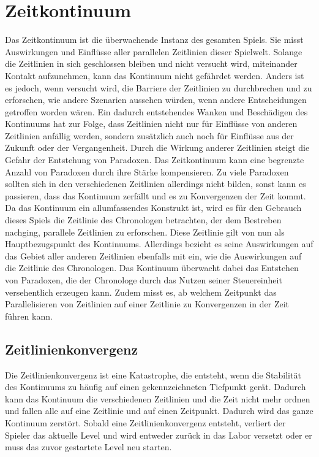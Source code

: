 \section{Zeitkontinuum}
Das Zeitkontinuum ist die überwachende Instanz des gesamten Spiels. Sie misst Auswirkungen und Einflüsse aller parallelen Zeitlinien dieser Spielwelt. Solange die Zeitlinien in sich geschlossen bleiben und nicht versucht wird, miteinander Kontakt aufzunehmen, kann das Kontinuum nicht gefährdet werden. Anders ist es jedoch, wenn versucht wird, die Barriere der Zeitlinien zu durchbrechen und zu erforschen, wie andere Szenarien aussehen würden, wenn andere Entscheidungen getroffen worden wären. Ein dadurch entstehendes Wanken und Beschädigen des Kontinuums hat zur Folge, dass Zeitlinien nicht nur für Einflüsse von anderen Zeitlinien anfällig werden, sondern zusätzlich auch noch für Einflüsse aus der Zukunft oder der Vergangenheit. Durch die Wirkung anderer Zeitlinien steigt die Gefahr der Entstehung von Paradoxen. Das Zeitkontinuum kann eine begrenzte Anzahl von Paradoxen durch ihre Stärke kompensieren. Zu viele Paradoxen sollten sich in den verschiedenen Zeitlinien allerdings nicht bilden, sonst kann es passieren, dass das Kontinuum zerfällt und es zu Konvergenzen der Zeit kommt. Da das Kontinuum ein allumfassendes Konstrukt ist, wird es für den Gebrauch dieses Spiels die Zeitlinie des Chronologen betrachten, der dem Bestreben nachging, parallele Zeitlinien zu erforschen. Diese Zeitlinie gilt von nun als Hauptbezugspunkt des Kontinuums. Allerdings bezieht es seine Auswirkungen auf das Gebiet aller anderen Zeitlinien ebenfalls mit ein, wie die Auswirkungen auf die Zeitlinie des Chronologen. Das Kontinuum überwacht dabei das Entstehen von Paradoxen, die der Chronologe durch das Nutzen seiner Steuereinheit versehentlich erzeugen kann. Zudem misst es, ab welchem Zeitpunkt das Parallelisieren von Zeitlinien auf einer Zeitlinie zu Konvergenzen in der Zeit führen kann.

\subsection{Zeitlinienkonvergenz}\label{sec:konvergenz}
Die Zeitlinienkonvergenz ist eine Katastrophe, die entsteht, wenn die Stabilität des Kontinuums zu häufig auf einen gekennzeichneten Tiefpunkt gerät. Dadurch kann das Kontinuum die verschiedenen Zeitlinien und die Zeit nicht mehr ordnen und fallen alle auf eine Zeitlinie und auf einen Zeitpunkt. Dadurch wird das ganze Kontinuum zerstört. Sobald eine Zeitlinienkonvergenz entsteht, verliert der Spieler das aktuelle Level und wird entweder zurück in das Labor versetzt oder er muss das zuvor gestartete Level neu starten.


